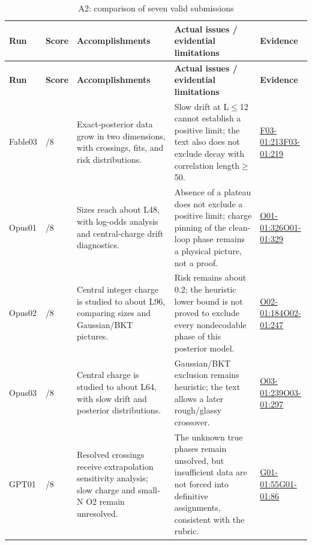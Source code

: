 \documentclass[11pt,a4paper]{article}
\begin{document}
{\fontsize{9.0}{12.6}\selectfont
\setlength{\tabcolsep}{2.5pt}
\begin{longtable}{>{\raggedright\arraybackslash}p{}>{\raggedright\arraybackslash}p{}>{\raggedright\arraybackslash}p{}>{\raggedright\arraybackslash}p{}>{\raggedright\arraybackslash}p{}}
\caption{A2: comparison of seven valid submissions}\\
\toprule
\textbf{Run} & \textbf{Score} & \textbf{Accomplishments} & \textbf{Actual issues /\allowbreak{} evidential limitations} & \textbf{Evidence}\tabularnewline
\midrule
\endfirsthead
\toprule
\textbf{Run} & \textbf{Score} & \textbf{Accomplishments} & \textbf{Actual issues /\allowbreak{} evidential limitations} & \textbf{Evidence}\tabularnewline
\midrule
\endhead
{}Fable03 & 4/\allowbreak{}8 & Exact-posterior data grow in two dimensions,\allowbreak{} with crossings,\allowbreak{} fits,\allowbreak{} and risk distributions. & Slow drift at L\ensuremath{\leq}12 cannot establish a positive limit; the text also does not exclude decay with correlation length\ensuremath{\geq}50. & \hyperref[src:F03-01]{F03-01:213}\newline \hyperref[src:F03-01]{F03-01:219}\tabularnewline
{}Opus01 & 5/\allowbreak{}8 & Sizes reach about L48,\allowbreak{} with log-odds analysis and central-charge drift diagnostics. & Absence of a plateau does not exclude a positive limit; charge pinning of the clean-loop phase remains a physical picture,\allowbreak{} not a proof. & \hyperref[src:O01-01]{O01-01:326}\newline \hyperref[src:O01-01]{O01-01:329}\tabularnewline
{}Opus02 & 5/\allowbreak{}8 & Central integer charge is studied to about L96,\allowbreak{} comparing sizes and Gaussian/\allowbreak{}BKT pictures. & Risk remains about 0.2; the heuristic lower bound is not proved to exclude every nondecodable phase of this posterior model. & \hyperref[src:O02-01]{O02-01:184}\newline \hyperref[src:O02-01]{O02-01:247}\tabularnewline
{}Opus03 & 5/\allowbreak{}8 & Central charge is studied to about L64,\allowbreak{} with slow drift and posterior distributions. & Gaussian/\allowbreak{}BKT exclusion remains heuristic; the text allows a later rough/\allowbreak{}glassy crossover. & \hyperref[src:O03-01]{O03-01:239}\newline \hyperref[src:O03-01]{O03-01:297}\tabularnewline
{}GPT01 & 8/\allowbreak{}8 & Resolved crossings receive extrapolation sensitivity analysis; slow charge and small-N O2 remain unresolved. & The unknown true phases remain unsolved,\allowbreak{} but insufficient data are not forced into definitive assignments,\allowbreak{} consistent with the rubric. & \hyperref[src:G01-01]{G01-01:55}\newline \hyperref[src:G01-01]{G01-01:86}\tabularnewline

\end{longtable}}
\end{document}
